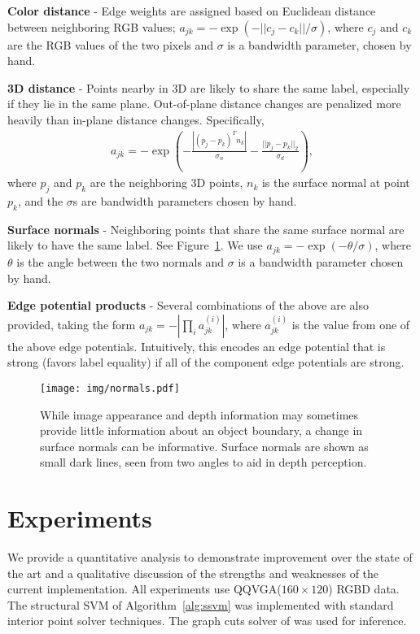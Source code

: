 \documentclass[journal]{IEEEtran}
\newcommand{\qqvga}{QQVGA\xspace}
\begin{document}

\textbf{Color distance} - Edge weights are assigned based on Euclidean distance between neighboring RGB values; $a_{jk} = - \exp(-||c_j - c_k|| / \sigma)$, where $c_j$ and $c_k$ are the RGB values of the two pixels and $\sigma$ is a bandwidth parameter, chosen by hand.

\textbf{3D distance} - Points nearby in 3D are likely to share the same label, especially if they lie in the same plane.  Out-of-plane distance changes are penalized more heavily than in-plane distance changes.  Specifically,
\begin{align*}
  a_{jk} = -\exp \left( -\frac{|(p_j - p_k)^T n_k|}{\sigma_n} - \frac{||p_j - p_k||_2}{\sigma_d} \right),
\end{align*}
where $p_j$ and $p_k$ are the neighboring 3D points, $n_k$ is the surface normal at point $p_k$, and the $\sigma$s are bandwidth parameters chosen by hand.

\textbf{Surface normals} - Neighboring points that share the same surface normal are likely to have the same label.  See Figure~\ref{fig:normals}. We use $a_{jk} = - \exp(-\theta / \sigma)$, where $\theta$ is the angle between the two normals and $\sigma$ is a bandwidth parameter chosen by hand.

\textbf{Edge potential products} - Several combinations of the above are also provided, taking the form $a_{jk} = -|\prod_i a^{(i)}_{jk}|$, where $a^{(i)}_{jk}$ is the value from one of the above edge potentials.  Intuitively, this encodes an edge potential that is strong (\ie favors label equality) if all of the component edge potentials are strong.

\begin{figure}
  \centering
  \texttt{[image: img/normals.pdf]}
  \caption{While image appearance and depth information may sometimes provide little information about an object boundary, a change in surface normals can be informative. Surface normals are shown as small dark lines, seen from two angles to aid in depth perception.}
  \label{fig:normals}
\end{figure}


\section{Experiments}

We provide a quantitative analysis to demonstrate improvement over the state of the art and a qualitative discussion of the strengths and weaknesses of the current implementation.  All experiments use \qqvga (\ie $160 \times 120$) RGBD data.  The structural SVM of Algorithm~\ref{alg:ssvm} was implemented with standard interior point solver techniques.  The graph cuts solver of \cite{boykov2001a} was used for inference.
\end{document}
